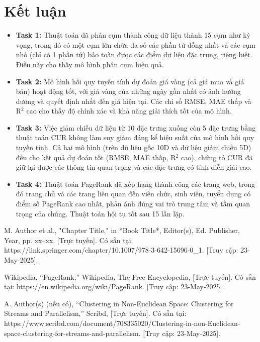 \documentclass[conference]{IEEEtran}
\begin{document}
\section{Kết luận}
\begin{itemize}
    \item \textbf{Task 1:}
    Thuật toán đã phân cụm thành công dữ liệu thành 15 cụm như kỳ vọng, trong đó có một cụm lớn chứa đa số các phần tử đồng nhất và các cụm nhỏ (chỉ có 1 phần tử) bảo toàn được các điểm dữ liệu đặc trưng, riêng biệt. Điều này cho thấy mô hình phân cụm hiệu quả.

    \item \textbf{Task 2:}
    Mô hình hồi quy tuyến tính dự đoán giá vàng (cả giá mua và giá bán) hoạt động tốt, với giá vàng của những ngày gần nhất có ảnh hưởng dương và quyết định nhất đến giá hiện tại. Các chỉ số RMSE, MAE thấp và R$^2$ cao cho thấy độ chính xác và khả năng giải thích tốt của mô hình.

    \item \textbf{Task 3:}
    Việc giảm chiều dữ liệu từ 10 đặc trưng xuống còn 5 đặc trưng bằng thuật toán CUR không làm suy giảm đáng kể hiệu suất của mô hình hồi quy tuyến tính. Cả hai mô hình (trên dữ liệu gốc 10D và dữ liệu giảm chiều 5D) đều cho kết quả dự đoán tốt (RMSE, MAE thấp, R$^2$ cao), chứng tỏ CUR đã giữ lại được các thông tin quan trọng và các đặc trưng có tính diễn giải cao.

    \item \textbf{Task 4:}
    Thuật toán PageRank đã xếp hạng thành công các trang web, trong đó trang chủ và các trang liên quan đến viên chức, sinh viên, tuyển dụng có điểm số PageRank cao nhất, phản ánh đúng vai trò trung tâm và tầm quan trọng của chúng. Thuật toán hội tụ tốt sau 15 lần lặp.
\end{itemize}

\begin{thebibliography}{00}
M. Author et al., "Chapter Title," in *Book Title*, Editor(s), Ed. Publisher, Year, pp. xx–xx. [Trực tuyến]. Có sẵn tại: https://link.springer.com/chapter/10.1007/978-3-642-15696-0\_1. [Truy cập: 23-May-2025].

Wikipedia, “PageRank,” Wikipedia, The Free Encyclopedia, [Trực tuyến]. Có sẵn tại: https://en.wikipedia.org/wiki/PageRank. [Truy cập: 23-May-2025].

A. Author(s) (nếu có), “Clustering in Non-Euclidean Space: Clustering for Streams and Parallelism,” Scribd, [Trực tuyến]. Có sẵn tại: https://www.scribd.com/document/708335020/Clustering-in-non-Euclidean-space-clustering-for-streams-and-parallelism. [Truy cập: 23-May-2025].
\end{thebibliography}
\end{document}
